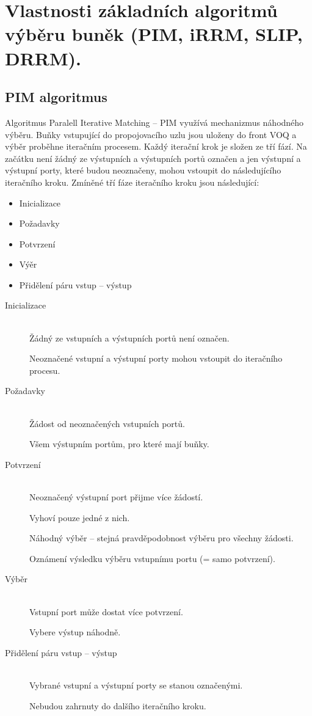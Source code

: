 \newpage
\section{Vlastnosti základních algoritmů výběru buněk (PIM, iRRM, SLIP, DRRM).}
\subsection{PIM algoritmus}
Algoritmus Paralell Iterative Matching -- PIM využívá mechanizmus náhodného výběru. Buňky vstupující do propojovacího uzlu jsou uloženy do front VOQ a výběr proběhne iteračním procesem. Každý iterační krok je složen ze tří fází. Na začátku není žádný ze výstupních a výstupních portů označen a jen výstupní a výstupní porty, které budou neoznačeny, mohou vstoupit do následujícího iteračního kroku. Zmíněné tří fáze iteračního kroku jsou následující:
\begin{itemize}
    \item Inicializace\par
    \item Požadavky\par
    \item Potvrzení\par
    \item Výěr\par
    \item Přidělení páru vstup -- výstup\par
\end{itemize}
\begin{description}
  \item[Inicializace] \hfill \\
  Žádný ze vstupních a výstupních portů není označen.\par
  Neoznačené vstupní a výstupní porty mohou vstoupit do iteračního procesu.
  \item[Požadavky] \hfill \\
  Žádost od neoznačených vstupních portů.\par
  Všem výstupním portům, pro které mají buňky.
  \item[Potvrzení] \hfill \\ 
  Neoznačený výstupní port přijme více žádostí.\par
  Vyhoví pouze jedné z nich. \par
  Náhodný výběr -- stejná pravděpodobnost výběru pro všechny žádosti.\par
  Oznámení výsledku výběru vstupnímu portu (= samo potvrzení).
  \item[Výběr] \hfill \\
  Vstupní port může dostat více potvrzení.\par
  Vybere výstup náhodně.
  \item[Přidělení páru vstup -- výstup] \hfill \\
  Vybrané vstupní a výstupní porty se stanou označenými.\par
  Nebudou zahrnuty do dalšího iteračního kroku.\par
\end{description}

